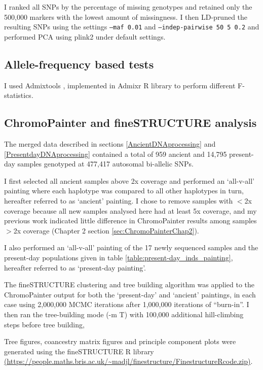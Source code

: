 I ranked all SNPs by the percentage of missing genotypes and retained only the 500,000 markers with the lowest amount of missingness. I then LD-pruned the resulting SNPs using the settings \texttt{--maf 0.01} and \texttt{--indep-pairwise 50 5 0.2} and performed PCA using plink2 under default settings. 

\subsection{Allele-frequency based tests}

I used Admixtools \cite{Patterson2012}, implemented in Admixr R library \cite{admixrpetr2019} to perform  different F-statistics.

\subsection{ChromoPainter and fineSTRUCTURE analysis}

The merged data described in sections \ref{AncientDNAprocessing} and \ref{PresentdayDNAprocessing} contained a total of 959 ancient and 14,795 present-day samples genotyped at 477,417 autosomal bi-allelic SNPs.

I first selected all ancient samples above 2x coverage and performed an `all-v-all' painting where each haplotype was compared to all other haplotypes in turn, hereafter referred to as `ancient' painting. I chose to remove samples with $<$2x coverage because all new samples analysed here had at least 5x coverage, and my previous work indicated little difference in ChromoPainter results among samples $>$2x coverage (Chapter 2 section \ref{sec:ChromoPainterChap2}). 

I also performed an `all-v-all' painting of the 17 newly sequenced samples and the present-day populations given in table \ref{table:present-day_inds_painting}, hereafter referred to as `present-day painting'.


The fineSTRUCTURE \cite{Lawson2012} clustering and tree building algorithm was applied to the ChromoPainter output for both the `present-day' and `ancient' paintings, in each case using 2,000,000 MCMC iterations after 1,000,000 iterations of ``burn-in''. I then ran the tree-building mode (-m T) with 100,000 additional hill-climbing steps before tree building,

Tree figures, coancestry matrix figures and principle component plots were generated using the fineSTRUCTURE R library \url{(https://people.maths.bris.ac.uk/~madjl/finestructure/FinestructureRcode.zip)}.

